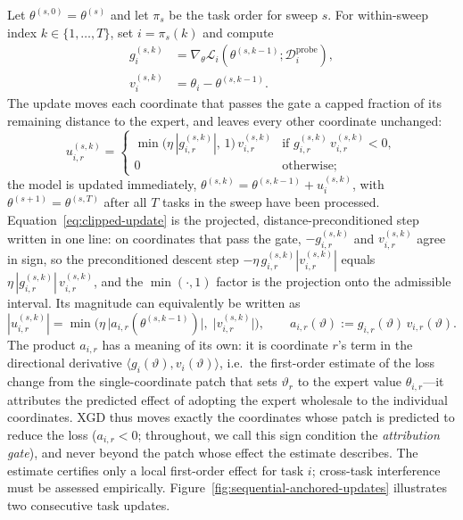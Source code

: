 \documentclass{article} %
\newcommand{\loss}{\mathcal{L}}
\newcommand{\data}{\mathcal{D}}
\begin{document}
Let $\theta^{(s,0)}=\theta^{(s)}$ and let $\pi_s$ be the task order for sweep $s$. For within-sweep index $k\in\{1,\ldots,T\}$, set $i=\pi_s(k)$ and compute
\begin{align}
    g_i^{(s,k)}
    &=
    \nabla_\theta \loss_i(\theta^{(s,k-1)};\data_i^{\mathrm{probe}}),
    \label{eq:sequential-gradient}\\
    v_i^{(s,k)}
    &=
    \theta_i - \theta^{(s,k-1)}.
    \label{eq:sequential-direction}
\end{align}
The update moves each coordinate that passes the gate a capped fraction of its remaining distance to the expert, and leaves every other coordinate unchanged:
\begin{equation}
    u_{i,r}^{(s,k)}
    =
    \begin{cases}
        \min\!\bigl(\eta\,|g_{i,r}^{(s,k)}|,\,1\bigr)\,v_{i,r}^{(s,k)}
        & \text{if } g_{i,r}^{(s,k)}\,v_{i,r}^{(s,k)} < 0,\\[3pt]
        0 & \text{otherwise;}
    \end{cases}
    \label{eq:clipped-update}
\end{equation}
the model is updated immediately, $\theta^{(s,k)}=\theta^{(s,k-1)}+u_i^{(s,k)}$, with $\theta^{(s+1)}=\theta^{(s,T)}$ after all $T$ tasks in the sweep have been processed. Equation~\eqref{eq:clipped-update} is the projected, distance-preconditioned step written in one line: on coordinates that pass the gate, $-g_{i,r}^{(s,k)}$ and $v_{i,r}^{(s,k)}$ agree in sign, so the preconditioned descent step $-\eta\,g_{i,r}^{(s,k)}|v_{i,r}^{(s,k)}|$ equals $\eta\,|g_{i,r}^{(s,k)}|\,v_{i,r}^{(s,k)}$, and the $\min(\cdot,1)$ factor is the projection onto the admissible interval. Its magnitude can equivalently be written as
\[
    |u_{i,r}^{(s,k)}|
    =
    \min\!\bigl(\eta\,\lvert a_{i,r}(\theta^{(s,k-1)})\rvert,\;\lvert v_{i,r}^{(s,k)}\rvert\bigr),
    \qquad
    a_{i,r}(\vartheta)
    :=
    g_{i,r}(\vartheta)\,v_{i,r}(\vartheta).
\]
The product $a_{i,r}$ has a meaning of its own: it is coordinate $r$'s term in the directional derivative $\langle g_i(\vartheta),v_i(\vartheta)\rangle$, i.e.\ the first-order estimate of the loss change from the single-coordinate patch that sets $\vartheta_r$ to the expert value $\theta_{i,r}$---it attributes the predicted effect of adopting the expert wholesale to the individual coordinates. XGD thus moves exactly the coordinates whose patch is predicted to reduce the loss ($a_{i,r}<0$; throughout, we call this sign condition the \emph{attribution gate}), and never beyond the patch whose effect the estimate describes. The estimate certifies only a local first-order effect for task $i$; cross-task interference must be assessed empirically. Figure~\ref{fig:sequential-anchored-updates} illustrates two consecutive task updates.
\end{document}
